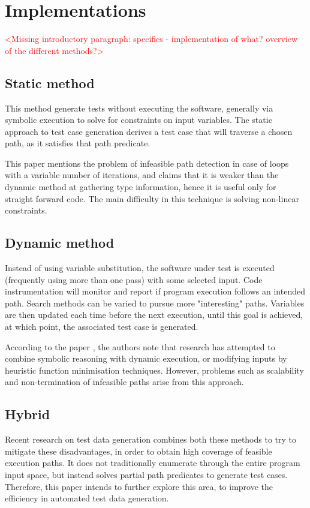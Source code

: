 \documentclass{icldt}
\numberwithin{equation}{section}       %
\begin{document}
\section{Implementations}

\textcolor{red}{<Missing introductory paragraph: specifics - implementation of what? overview of the different methods?>}

\subsection{Static method}
This method generate tests without executing the software, generally via symbolic execution to solve for constraints on input variables. The static approach to test case generation derives a test case that will traverse a chosen path, as it satisfies that path predicate.

This paper \cite{Tahbildar} mentions the problem of infeasible path detection in case of loops with a variable number of iterations, and claims that it is weaker than the dynamic method at gathering type information, hence it is useful only for straight forward code. The main difficulty in this technique is solving non-linear constraints.

\subsection{Dynamic method}
Instead of using variable substitution, the software under test is executed (frequently using more than one pass) with some selected input. Code instrumentation will monitor and report if program execution follows an intended path. Search methods can be varied to pursue more "interesting" paths. Variables are then updated each time before the next execution, until this goal is achieved, at which point, the associated test case is generated.

According to the paper \cite{Tahbildar}, the authors note that research has attempted to combine symbolic reasoning with dynamic execution, or modifying inputs by heuristic function minimisation techniques. However, problems such as scalability and non-termination of infeasible paths arise from this approach.

\subsection{Hybrid}
Recent research on test data generation combines both these methods to try to mitigate these disadvantages, in order to obtain high coverage of feasible execution paths. It does not traditionally enumerate through the entire program input space, but instead solves partial path predicates to generate test cases. Therefore, this paper intends to further explore this area, to improve the efficiency in automated test data generation.
\end{document}
